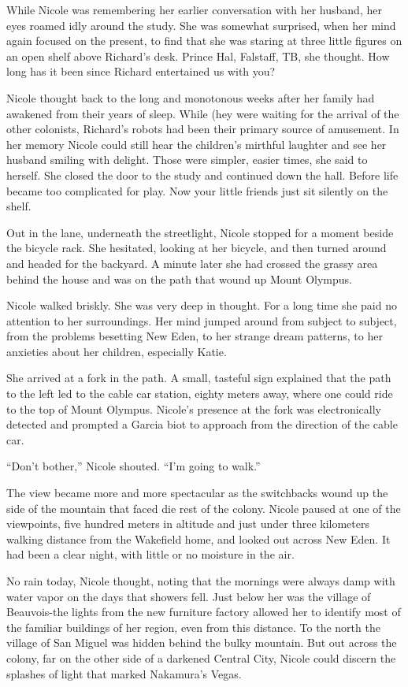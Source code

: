 \documentclass[]{article}
\begin{document}
{While Nicole was remembering her earlier conversation with her husband, her eyes roamed idly around the study.  She was somewhat surprised, when her mind again focused on the present, to find that she was staring at three little figures on an open shelf above Richard’s desk.  Prince Hal, Falstaff, TB, she thought.  How long has it been since Richard entertained us with you?

Nicole thought back to the long and monotonous weeks after her family had awakened from their years of sleep.  While (hey were waiting for the arrival of the other colonists, Richard’s robots had been their primary source of amusement.  In her memory Nicole could still hear the children’s mirthful laughter and see her husband smiling with delight.  Those were simpler, easier times, she said to herself.  She closed the door to the study and continued down the hall.  Before life became too complicated for play.  Now your little friends just sit silently on the shelf.

Out in the lane, underneath the streetlight, Nicole stopped for a moment beside the bicycle rack.  She hesitated, looking at her bicycle, and then turned around and headed for the backyard.  A minute later she had crossed the grassy area behind the house and was on the path that wound up Mount Olympus.

Nicole walked briskly.  She was very deep in thought.  For a long time she paid no attention to her surroundings.  Her mind jumped around from subject to subject, from the problems besetting New Eden, to her strange dream patterns, to her anxieties about her children, especially Katie.

She arrived at a fork in the path.  A small, tasteful sign explained that the path to the left led to the cable car station, eighty meters away, where one could ride to the top of Mount Olympus.  Nicole’s presence at the fork was electronically detected and prompted a Garcia biot to approach from the direction of the cable car.

“Don’t bother,” Nicole shouted.  “I’m going to walk.”

The view became more and more spectacular as the switchbacks wound up the side of the mountain that faced die rest of the colony.  Nicole paused at one of the viewpoints, five hundred meters in altitude and just under three kilometers walking distance from the Wakefield home, and looked out across New Eden.  It had been a clear night, with little or no moisture in the air.

No rain today, Nicole thought, noting that the mornings were always damp with water vapor on the days that showers fell.  Just below her was the village of Beauvois-the lights from the new furniture factory allowed her to identify most of the familiar buildings of her region, even from this distance.  To the north the village of San Miguel was hidden behind the bulky mountain.  But out across the colony, far on the other side of a darkened Central City, Nicole could discern the splashes of light that marked Nakamura’s Vegas.

}
\end{document}
